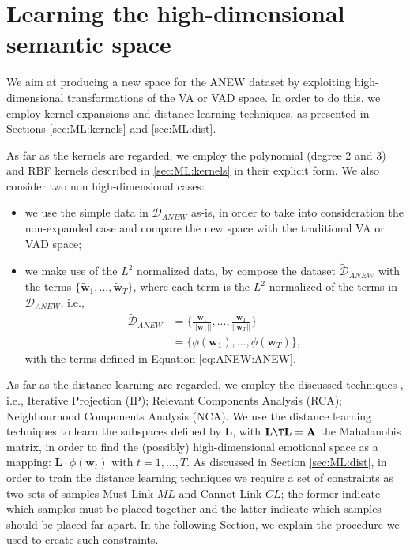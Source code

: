 \section{Learning the high-dimensional semantic space}
\label{sec:ANEW:moodtag}
We aim at producing a new space for the ANEW dataset by exploiting high-dimensional transformations of the VA or VAD space. In order to do this, we employ kernel expansions and distance learning techniques, as presented in Sections \ref{sec:ML:kernels} and \ref{sec:ML:dist}.

As far as the kernels are regarded, we employ the polynomial (degree 2 and 3) and RBF kernels described in \ref{sec:ML:kernels} in their explicit form. We also consider two non high-dimensional cases:
\begin{itemize}
\item we use the simple data in $\mathcal{D}_{ANEW}$ as-is, in order to take into consideration the non-expanded case and compare the new space with the traditional VA or VAD space;
\item we make use of the $L^2$ normalized data, by compose the dataset $\tilde{\mathcal{D}}_{ANEW}$ with the terms $\{\tilde{\mathbf{w}}_1,..., \tilde{\mathbf{w}}_T \}$, where each term is the $L^2$-normalized of the terms in $\mathcal{D}_{ANEW}$, i.e., 
\begin{equation}
\begin{split}
\tilde{\mathcal{D}}_{ANEW} &=\{ \frac{\mathbf{w}_1}{||\mathbf{w}_1||},..., \frac{\mathbf{w}_T}{||\mathbf{w}_T||}  \}\\
&=\{\phi(\mathbf{w}_1), ..., \phi(\mathbf{w}_T)   \},
\end{split}
\end{equation}
with the terms defined in Equation \ref{eq:ANEW:ANEW}.
\end{itemize}

As far as the distance learning are regarded, we employ the discussed techniques \cite{Carey2015}, i.e., Iterative Projection\cite{xing2003distance} (IP); Relevant Components Analysis \cite{bar2003learning} (RCA); Neighbourhood Components Analysis \cite{goldberger2004neighbourhood} (NCA). We use the distance learning techniques to learn the subspaces defined by $\mathbf{L}$, with $\mathbf{L}\T \mathbf{L}=\mathbf{A}$ the Mahalanobis matrix, in order to find the (possibly) high-dimensional emotional space as a mapping: $\mathbf{L} \cdot \phi ( \mathbf{w}_t) $ with $t=1,...,T$. As discussed in Section \ref{sec:ML:dist}, in order to train the distance learning techniques we require a set of constraints as two sets of samples Must-Link $ML$ and Cannot-Link $CL$; the former indicate which samples must be placed together and the latter indicate which samples should be placed far apart. In the following Section, we explain the procedure we used to create such constraints.

